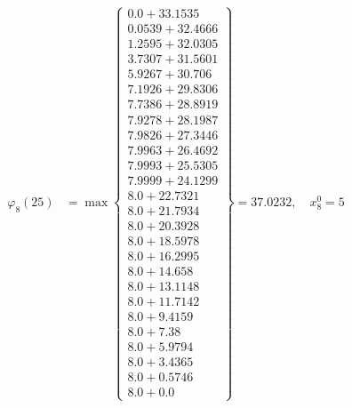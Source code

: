 \documentclass{article}
\begin{document}
\begin{align*}
\varphi_{8}(25) &= \max \left\{ \begin{array}{c}
0.0 + 33.1535 \\
 0.0539 + 32.4666 \\
 1.2595 + 32.0305 \\
 3.7307 + 31.5601 \\
 5.9267 + 30.706 \\
 7.1926 + 29.8306 \\
 7.7386 + 28.8919 \\
 7.9278 + 28.1987 \\
 7.9826 + 27.3446 \\
 7.9963 + 26.4692 \\
 7.9993 + 25.5305 \\
 7.9999 + 24.1299 \\
 8.0 + 22.7321 \\
 8.0 + 21.7934 \\
 8.0 + 20.3928 \\
 8.0 + 18.5978 \\
 8.0 + 16.2995 \\
 8.0 + 14.658 \\
 8.0 + 13.1148 \\
 8.0 + 11.7142 \\
 8.0 + 9.4159 \\
 8.0 + 7.38 \\
 8.0 + 5.9794 \\
 8.0 + 3.4365 \\
 8.0 + 0.5746 \\
 8.0 + 0.0
\end{array} \right\}=37.0232, \quad x_{8}^0=5\\
  

\end{align*}
\end{document}
